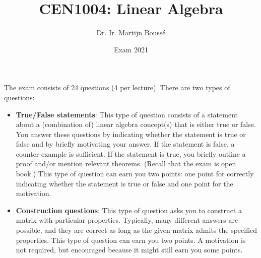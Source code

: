 \documentclass{exam}
\title{CEN1004: Linear Algebra}
\date{Exam 2021}
\author{Dr. Ir. Martijn Bouss\'e}
\begin{document}
\maketitle

The exam consists of 24 questions (4 per lecture). There are two types of questions:
\begin{itemize}
	\item \textbf{True/False statements}: This type of question consists of a statement about a (combination of) linear algebra concept(s) that is either true or false. You answer these questions by indicating whether the statement is true or false and by briefly motivating your answer. If the statement is false, a counter-example is sufficient. If the statement is true, you briefly outline a proof and/or mention relevant theorems. (Recall that the exam is open book.) This type of question can earn you two points: one point for correctly indicating whether the statement is true or false and one point for the motivation.
	\item \textbf{Construction questions}: This type of question asks you to construct a matrix with particular properties. Typically, many different answers are possible, and they are correct as long as the given matrix admits the specified properties. This type of question can earn you two points. A motivation is not required, but encouraged because it might still earn you some points.
\end{itemize}
\end{document}
